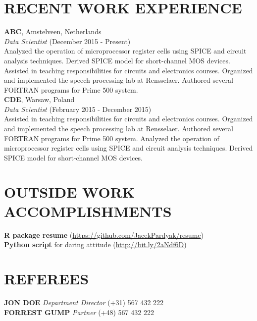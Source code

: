 \documentclass[a4paper, line, 11pt]{res} %
\begin{document}
\begin{resume}
  
\section{RECENT WORK EXPERIENCE}
    \textbf{\uppercase{ABC}}, Amstelveen, Netherlands \\ \emph{Data Scientist} (December 2015 - Present)\\ Analyzed the operation of microprocessor register cells using SPICE and
circuit analysis techniques. Derived SPICE model for short-channel MOS
devices. Assisted in teaching responsibilities for circuits and
electronics courses. Organized and implemented the speech processing lab
at Rensselaer. Authored several FORTRAN programs for Prime 500 system. \\
    \textbf{\uppercase{CDE}}, Warsaw, Poland \\ \emph{Data Scientist} (February 2015 - December 2015)\\ Assisted in teaching responsibilities for circuits and electronics
courses. Organized and implemented the speech processing lab at
Rensselaer. Authored several FORTRAN programs for Prime 500 system.
Analyzed the operation of microprocessor register cells using SPICE and
circuit analysis techniques. Derived SPICE model for short-channel MOS
devices. 


\section{OUTSIDE WORK ACCOMPLISHMENTS}  
\textbf{R package resume} (\url{https://github.com/JacekPardyak/resume})\\
\textbf{Python script} for daring attitude (\url{http://bit.ly/2aNdf6D})

\section{REFEREES}  

\textbf{\uppercase{Jon Doe}} \emph{Department Director} (+31) 567 432 222\\
\textbf{\uppercase{Forrest Gump}} \emph{Partner} (+48) 567 432 222


\end{resume}
\end{document}
